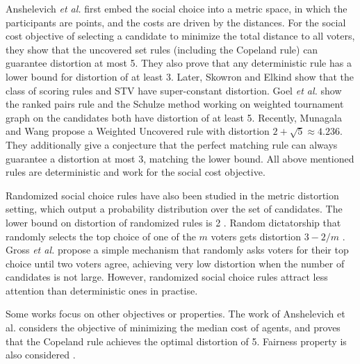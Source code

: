\documentclass[11pt]{article}
\theoremstyle{remark}
\begin{document}
Anshelevich \emph{et al.} \cite{anshelevich2015approximating} first embed the social choice into a metric space, in which the participants are points, and the
costs are driven by the distances. For the social cost objective of selecting a candidate to minimize the total distance to all voters, they show that the uncovered set rules \cite{moulin1986choosing} (including the Copeland rule) can guarantee distortion at most 5. They also prove that any deterministic rule has a lower bound for distortion of at least 3. Later, Skowron and Elkind \cite{skowron2017social} show that the class of scoring rules and STV have super-constant distortion. %
 Goel \emph{et al.} \cite{gross2017vote} show the ranked pairs rule and the Schulze method working on weighted tournament graph on the candidates both have distortion of at least 5. Recently, Munagala and Wang  \cite{munagala2019improved} propose a Weighted Uncovered rule with distortion $2+\sqrt5\approx 4.236$. They additionally give a conjecture that the perfect matching rule can always guarantee a distortion at most 3, matching the lower bound. All above mentioned rules are deterministic and work for the social cost objective.


Randomized social choice rules  have also been studied in the metric distortion setting, which output a probability distribution over the set of candidates. The lower bound on distortion of randomized rules is 2 \cite{anshelevich2017randomized} \cite{feldman2016voting}. Random dictatorship that randomly selects
the top choice of one of the $m$ voters gets distortion $3-2/m$ \cite{anshelevich2017randomized} \cite{feldman2016voting}. Gross \emph{et al.} \cite{gross2017vote}
 propose a simple mechanism that randomly asks voters for their top choice until two voters agree, achieving very low distortion when the number of candidates is not large.
However, randomized social choice rules attract less attention than deterministic ones in practise.

 Some works focus on other objectives or properties. The work of Anshelevich et al. \cite{anshelevich2015approximating} considers the objective of minimizing the median cost of agents, and proves that the Copeland rule achieves  the optimal distortion of 5. Fairness property is also considered \cite{goel2018relating} \cite{munagala2019improved}.
\end{document}
